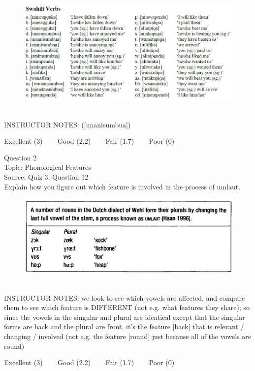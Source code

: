 \documentclass[12pt]{article}
\begin{document}
\begin{figure}[H]
\includegraphics{../images/swahiliverbs.png}
\end{figure}

~\\
INSTRUCTOR NOTES: ([unanisumbua])


\vfill
Excellent (3) ~~~ Good (2.2) ~~~ Fair (1.7) ~~~ Poor (0)
\newpage

{\large Question 2}\\

Topic: Phonological Features\\
Source: Quiz 3, Question 12\\

Explain how you figure out which feature is involved in the process of umlaut.\\

\begin{figure}[H]
\includegraphics{../images/dutch.png}
\end{figure}

~\\
INSTRUCTOR NOTES: we look to see which vowels are affected, and compare them to see which feature is DIFFERENT (not e.g. what features they share); so since the vowels in the singular and plural are identical except that the singular forms are back and the plural are front, it's the feature [back] that is relevant / changing / involved (not e.g. the feature [round] just because all of the vowels are round)


\vfill
Excellent (3) ~~~ Good (2.2) ~~~ Fair (1.7) ~~~ Poor (0)
\newpage

\begin{center}
\textbf{{\color{red}{\HUGE END OF EXAM}}}\\

\end{center}
\newpage
\end{document}
